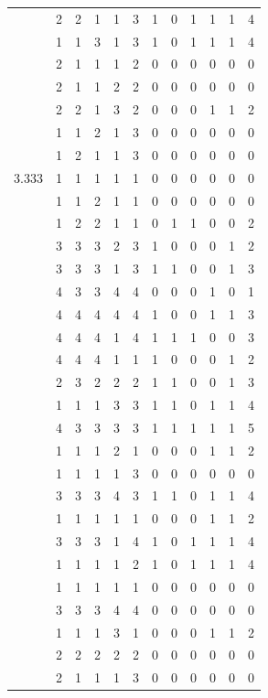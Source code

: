 \documentclass[]{book}
\theoremstyle{definition}
\theoremstyle{definition}
\theoremstyle{definition}
\theoremstyle{remark}
\begin{document}
\begin{table}
{\begin{tabular}[t]{rrrrrrrrrrrr}
 & 2 & 2 & 1 & 1 & 3 & 1 & 0 & 1 & 1 & 1 & 4\\
 & 1 & 1 & 3 & 1 & 3 & 1 & 0 & 1 & 1 & 1 & 4\\
 & 2 & 1 & 1 & 1 & 2 & 0 & 0 & 0 & 0 & 0 & 0\\
 & 2 & 1 & 1 & 2 & 2 & 0 & 0 & 0 & 0 & 0 & 0\\
 & 2 & 2 & 1 & 3 & 2 & 0 & 0 & 0 & 1 & 1 & 2\\
 & 1 & 1 & 2 & 1 & 3 & 0 & 0 & 0 & 0 & 0 & 0\\
 & 1 & 2 & 1 & 1 & 3 & 0 & 0 & 0 & 0 & 0 & 0\\
3.333 & 1 & 1 & 1 & 1 & 1 & 0 & 0 & 0 & 0 & 0 & 0\\
 & 1 & 1 & 2 & 1 & 1 & 0 & 0 & 0 & 0 & 0 & 0\\
 & 1 & 2 & 2 & 1 & 1 & 0 & 1 & 1 & 0 & 0 & 2\\
 & 3 & 3 & 3 & 2 & 3 & 1 & 0 & 0 & 0 & 1 & 2\\
 & 3 & 3 & 3 & 1 & 3 & 1 & 1 & 0 & 0 & 1 & 3\\
 & 4 & 3 & 3 & 4 & 4 & 0 & 0 & 0 & 1 & 0 & 1\\
 & 4 & 4 & 4 & 4 & 4 & 1 & 0 & 0 & 1 & 1 & 3\\
 & 4 & 4 & 4 & 1 & 4 & 1 & 1 & 1 & 0 & 0 & 3\\
 & 4 & 4 & 4 & 1 & 1 & 1 & 0 & 0 & 0 & 1 & 2\\
 & 2 & 3 & 2 & 2 & 2 & 1 & 1 & 0 & 0 & 1 & 3\\
 & 1 & 1 & 1 & 3 & 3 & 1 & 1 & 0 & 1 & 1 & 4\\
 & 4 & 3 & 3 & 3 & 3 & 1 & 1 & 1 & 1 & 1 & 5\\
 & 1 & 1 & 1 & 2 & 1 & 0 & 0 & 0 & 1 & 1 & 2\\
 & 1 & 1 & 1 & 1 & 3 & 0 & 0 & 0 & 0 & 0 & 0\\
 & 3 & 3 & 3 & 4 & 3 & 1 & 1 & 0 & 1 & 1 & 4\\
 & 1 & 1 & 1 & 1 & 1 & 0 & 0 & 0 & 1 & 1 & 2\\
 & 3 & 3 & 3 & 1 & 4 & 1 & 0 & 1 & 1 & 1 & 4\\
 & 1 & 1 & 1 & 1 & 2 & 1 & 0 & 1 & 1 & 1 & 4\\
 & 1 & 1 & 1 & 1 & 1 & 0 & 0 & 0 & 0 & 0 & 0\\
 & 3 & 3 & 3 & 4 & 4 & 0 & 0 & 0 & 0 & 0 & 0\\
 & 1 & 1 & 1 & 3 & 1 & 0 & 0 & 0 & 1 & 1 & 2\\
 & 2 & 2 & 2 & 2 & 2 & 0 & 0 & 0 & 0 & 0 & 0\\
 & 2 & 1 & 1 & 1 & 3 & 0 & 0 & 0 & 0 & 0 & 0\\

\end{tabular}}
\end{table}
\end{document}
